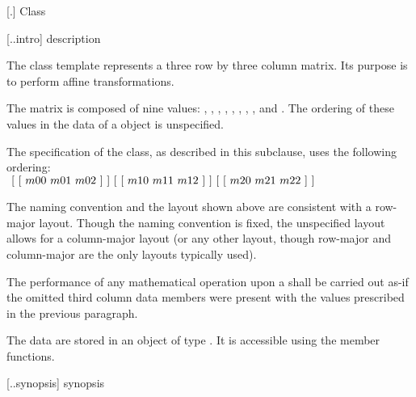  [\iotwod.\matrixtwod] {Class }

 [\iotwod.\matrixtwod.intro] { description}

%
\pnum
The class template  represents a three row by three column matrix. Its purpose is to perform affine transformations.

\pnum
The matrix is composed of nine  values: , , , , , , , , and . The ordering of these  values in the data of a  object is unspecified.

\pnum
The specification of the  class, as described in this subclause, uses the following ordering: \\
$
~[~[~m00~m01~m02~]~] \\
~[~[~m10~m11~m12~]~] \\
~[~[~m20~m21~m22~]~]$

\pnum
\begin{note}
The naming convention and the layout shown above are consistent with a row-major layout. Though the naming convention is fixed, the unspecified layout allows for a column-major layout (or any other layout, though row-major and column-major are the only layouts typically used).
\end{note}

\pnum
The performance of any mathematical operation upon a  shall be carried out as-if the omitted third column data members were present with the values prescribed in the previous paragraph.

\pnum
The data are stored in an object of type . It is accessible using the  member functions.

 [\iotwod.\matrixtwod.synopsis] { synopsis}

